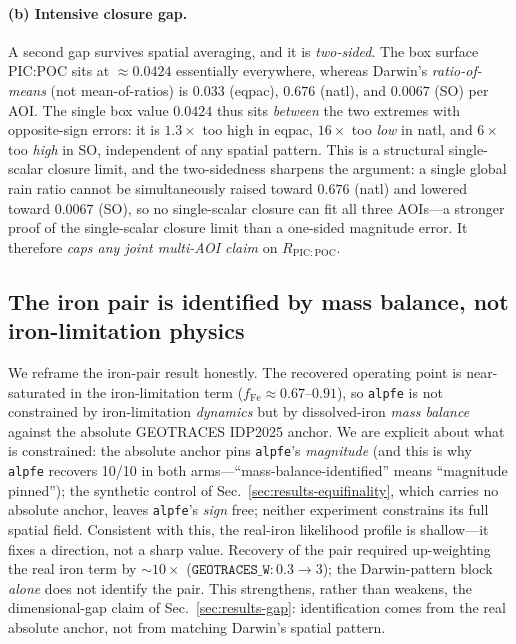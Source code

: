 \documentclass[11pt]{article}
\begin{document}
\paragraph{(b) Intensive closure gap.}
A second gap survives spatial averaging, and it is \emph{two-sided}. The box
surface PIC:POC sits at ${\approx}0.0424$ essentially everywhere, whereas Darwin's
\emph{ratio-of-means} (not mean-of-ratios) is
$0.033$ (eqpac), $0.676$ (natl), and $0.0067$ (SO) per AOI. The single box value
$0.0424$ thus sits \emph{between} the two extremes with opposite-sign errors: it
is $1.3\times$ too high in eqpac, $16\times$ too \emph{low} in natl, and
$6\times$ too \emph{high} in SO, independent of any spatial pattern. This is a
structural single-scalar closure limit, and the two-sidedness sharpens the
argument: a single global rain ratio cannot be simultaneously raised toward
$0.676$ (natl) and lowered toward $0.0067$ (SO), so no single-scalar closure can
fit all three AOIs---a stronger proof of the single-scalar closure limit than a
one-sided magnitude error. It therefore \emph{caps any joint multi-AOI claim} on
$R_{\mathrm{PIC:POC}}$.

\subsection{The iron pair is identified by mass balance, not iron-limitation physics}
\label{sec:results-iron}

We reframe the iron-pair result honestly. The recovered operating point is
near-saturated in the iron-limitation term ($f_{\mathrm{Fe}} \approx
0.67\text{--}0.91$), so \texttt{alpfe} is not constrained by iron-limitation
\emph{dynamics} but by dissolved-iron \emph{mass balance} against the absolute
GEOTRACES IDP2025 anchor. We are explicit about what is constrained: the absolute
anchor pins \texttt{alpfe}'s \emph{magnitude} (and this is why \texttt{alpfe}
recovers 10/10 in both arms---``mass-balance-identified'' means ``magnitude
pinned''); the synthetic control of Sec.~\ref{sec:results-equifinality}, which
carries no absolute anchor, leaves \texttt{alpfe}'s \emph{sign} free; neither
experiment constrains its full spatial field. Consistent with this, the real-iron
likelihood profile is shallow---it fixes a direction, not a sharp value. Recovery
of the pair required up-weighting the real iron term by ${\sim}10\times$
($\texttt{GEOTRACES\_W}: 0.3 \rightarrow 3$); the Darwin-pattern block
\emph{alone} does not identify the pair. This strengthens, rather than weakens,
the dimensional-gap claim of Sec.~\ref{sec:results-gap}: identification comes from
the real absolute anchor, not from matching Darwin's spatial pattern.
\end{document}
